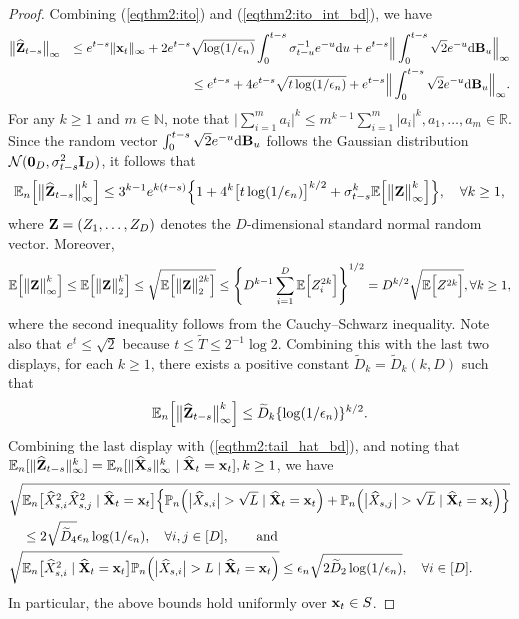 \documentclass[11pt,a4paper,final]{article}
\numberwithin{equation}{section}
\theoremstyle{remark}
\def\cN{\mathcal N}
\newcommand{\bB}{{\bf B}}
\newcommand{\bI}{{\bf I}}
\newcommand{\bx}{{\bf x}}
\newcommand{\bX}{{\bf X}}
\newcommand{\bZ}{{\bf Z}}
\newcommand{\bbE}{{\mathbb E}}
\newcommand{\bbR}{{\mathbb R}}
\newcommand{\bbN}{{\mathbb N}}
\newcommand{\bbP}{{\mathbb P}}
\newcommand{\be}{\begin{equation}}
\newcommand{\ee}{\end{equation}}
\newcommand{\bean}{\setlength\arraycolsep{1pt}\begin{eqnarray*}}
\newcommand{\eean}{\end{eqnarray*}}
\def\d{{\rm d}}
\begin{document}
\begin{proof}
Combining (\ref{eqthm2:ito}) and (\ref{eqthm2:ito_int_bd}), we have
\bean
\big\| \widehat \bZ_{t-s} \big\|_{\infty}
&& \leq  e^{t-s}\| \bx_{t} \|_{\infty}
+ 2 e^{t-s} \sqrt{\log (1/\epsilon_n) }  \int_{0}^{t-s} \sigma_{t-u}^{-1} e^{-u} \d u 
+ e^{t-s} \Big\| \int_{0}^{t-s} \sqrt{2} e^{-u} \d \bB_{u} \Big\|_{\infty}
\\
&& \leq e^{t-s} + 4 e^{t-s}  \sqrt{ t \log ( 1/\epsilon_n) } + e^{t-s} \Big\| \int_{0}^{t-s} \sqrt{2} e^{-u} \d \bB_{u} \Big\|_{\infty}.
\eean
For any $k \geq 1$ and $m \in \bbN$, note that $\vert \sum_{i=1}^{m} a_i \vert^{k} \leq m^{k-1} \sum_{i=1}^{m} \vert a_i \vert^{k}, a_{1},\ldots,a_{m} \in \bbR$.
Since the random vector $\int_{0}^{t-s} \sqrt{2} e^{-u} \d \bB_{u}$ follows the Gaussian distribution $\cN ( \mathbf{0}_{D}, \sigma_{t-s}^2 \bI_{D} )$, it follows that
\bean
\bbE_{n} \Big[ \big\| \widehat \bZ_{t-s} \big\|_{\infty}^{k} \Big]
\leq 3^{k-1} e^{k(t-s)} \Big\{ 1 + 4^{k} \big[ t \log (1/\epsilon_n)  \big]^{k/2}  + \sigma_{t-s}^{k} \bbE \Big[ \big\|  \bZ \big\|_{\infty}^{k} \Big] \Big\},
\quad \forall k \geq 1,
\eean
where $\bZ = (Z_1,\ldots,Z_{D})$ denotes the $D$-dimensional standard normal random vector.
Moreover,
\bean
\bbE \Big[ \big\| \bZ \big\|_{\infty}^{k} \Big]
\leq  \bbE \Big[ \big\| \bZ \big\|_{2}^{k} \Big]
\leq \sqrt{ \bbE \Big[ \big\| \bZ \big\|_{2}^{2k} \Big]} 
\leq \left\{  D^{k-1}  \sum_{i=1}^{D} \bbE \Big[ Z_i^{2k} \Big] \right\}^{1/2}
= D^{k/2} \sqrt{ \bbE \Big[ Z^{2k} \Big] },
\forall k \geq 1,
\eean
where the second inequality follows from the Cauchy--Schwarz inequality.
Note also that $e^{t} \leq \sqrt{2}$ because $t \leq {\widetilde T} \leq 2^{-1} \log 2$.
Combining this with the last two displays, for each $k \geq 1$, there exists a positive constant $\widetilde D_{k} = \widetilde D_{k}(k, D) $ such that
\be
\bbE_{n} \Big[ \big\| \widehat \bZ_{t-s} \big\|_{\infty}^{k} \Big]
\leq \widetilde D_{k} \{ \log ( 1/\epsilon_n) \}^{k/2}
\label{eqthm2:mom_hat_k_bd}.
\ee
Combining the last display with (\ref{eqthm2:tail_hat_bd}), and noting that $\bbE_{n} [ \| \widehat \bZ_{t-s} \|_{\infty}^{k} ] = \bbE_{n} [ \| \widehat \bX_{s} \|_{\infty}^{k} \mid \widehat \bX_{t} = \bx_{t} ], k \geq 1$, we have
\be
\begin{split}
 & \sqrt{ \bbE_{n} \big[ \widehat X_{s,i}^2 \widehat X_{s,j}^2 \mid \widehat \bX_{t} = \bx_{t} \big]  \Big\{  \bbP_{n} \Big(
\big\vert  \widehat  X_{s,i}  \big\vert > \sqrt{L} \mid  \widehat \bX_{t} = \bx_{t} 
\Big)
+ \bbP_{n} \Big(
\big\vert  \widehat  X_{s,j}  \big\vert > \sqrt{L} \mid  \widehat \bX_{t} = \bx_{t}
\Big) \Big\} } 
\\
&  \quad \leq 2 \sqrt{\widetilde D_{4}}  \epsilon_{n}   \log (1/\epsilon_n)  , \quad \forall i, j \in [D], 
\qquad \text{and}
\\
& \sqrt{ \bbE_{n} \big[ \widehat X_{s,i}^2  \mid  \widehat \bX_{t} = \bx_{t} \big]  \bbP_{n} \Big(
\big\vert   \widehat X_{s,i}  \big\vert > L \mid  \widehat \bX_{t} = \bx_{t} 
\Big) } 
\leq \epsilon_n \sqrt{ 2 \widetilde D_{2} \log (1/\epsilon_n) } ,
\quad \forall i \in [D].
\label{eqthm2:mom_hat_bd}
\end{split}
\ee
In particular, the above bounds hold uniformly over $\bx_t\in S$.


\end{proof}
\end{document}
